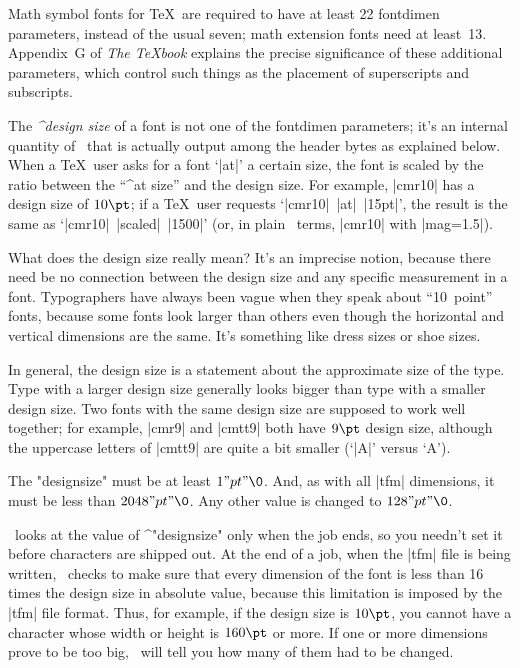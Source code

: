 Math symbol fonts for \TeX\ are required to have at least 22 fontdimen
parameters, instead of the usual seven; math extension fonts need at least~13.
Appendix~G of {\sl The \TeX book\/} explains the precise significance
of these additional parameters, which control such things as the
placement of superscripts and subscripts.

\medbreak
The {\sl^{design size}\/} of a font is not one of the fontdimen
parameters; it's an internal quantity of \MF\ that is actually output
among the header bytes as explained below. When a \TeX\ user asks
for a font `|at|' a certain size, the font is scaled by the ratio
between the ``^{at size}'' and the design size. For example,
|cmr10| has a design size of $10\pt$; if a \TeX\ user requests
`|cmr10|~|at|~|15pt|', the result is the same as `|cmr10|~|scaled|~|1500|'
(or, in plain \MF\ terms, |cmr10| with |mag=1.5|).

What does the design size really mean? It's an imprecise notion,
because there need be no connection between the design size and any specific
measurement in a font. Typographers have always been vague when
they speak about ``10~point'' fonts, because some fonts look larger
than others even though the horizontal and vertical dimensions are the same.
It's something like dress sizes or shoe sizes.

In general, the design size is a statement about the approximate size
of the type. Type with a larger design size generally looks bigger
than type with a smaller design size. Two fonts with the same design
size are supposed to work well together; for example, |cmr9| and
|cmtt9| both have $9\pt$ design size, although the uppercase letters of
|cmtt9| are quite a bit smaller (`|A|' versus `A').

The "designsize" must be at least $1"pt"\0$. And, as with all |tfm|
dimensions, it must be less than $2048"pt"\0$. Any other value is
changed to $128"pt"\0$.

\MF\ looks at the value of ^"designsize" only when the job ends, so you
needn't set it before characters are shipped out. At the end of a job,
when the |tfm| file is being written, \MF\ checks to make sure that every
dimension of the font is less than 16 times the design size in absolute
value, because this limitation is imposed by the |tfm| file format.  Thus,
for example, if the design size is $10\pt$, you cannot have a character
whose width or height is $160\pt$ or more. If one or more dimensions prove
to be too big, \MF\ will tell you how many of them had to be changed.

